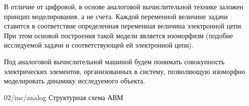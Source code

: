 В отличие от цифровой, в основе аналоговой вычислительной технике заложен принцип моделирования, а не счета. Каждой переменной величине задачи ставится в соответствие определенная переменная величина электронной цепи. При этом основой построения такой модели является изоморфизм (подобие исследуемой задачи и соответствующей ей электронной цепи).

\begin{dd}
    Под аналоговой вычислительной машиной будем понимать совокупность электрических элементов, организованных в систему, позволяющую изоморфно моделировать динамику исследуемого объекта.
\end{dd}

\image
{\textwidth}
{02/inc/analog}
{Структурная схема АВМ}